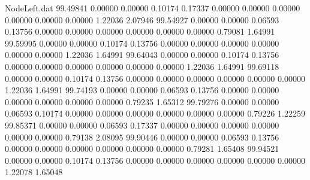 \begin{filecontents}{NodeLeft.dat}
  99.49841    0.00000    0.00000     0.10174    0.17337    0.00000    0.00000    0.00000    0.00000    0.00000    0.00000    1.22036    2.07946
  99.54927    0.00000    0.00000     0.06593    0.13756    0.00000    0.00000    0.00000    0.00000    0.00000    0.00000    0.79081    1.64991
  99.59995    0.00000    0.00000     0.10174    0.13756    0.00000    0.00000    0.00000    0.00000    0.00000    0.00000    1.22036    1.64991
  99.64043    0.00000    0.00000     0.10174    0.13756    0.00000    0.00000    0.00000    0.00000    0.00000    0.00000    1.22036    1.64991
  99.69118    0.00000    0.00000     0.10174    0.13756    0.00000    0.00000    0.00000    0.00000    0.00000    0.00000    1.22036    1.64991
  99.74193    0.00000    0.00000     0.06593    0.13756    0.00000    0.00000    0.00000    0.00000    0.00000    0.00000    0.79235    1.65312
  99.79276    0.00000    0.00000     0.06593    0.10174    0.00000    0.00000    0.00000    0.00000    0.00000    0.00000    0.79226    1.22259
  99.85371    0.00000    0.00000     0.06593    0.17337    0.00000    0.00000    0.00000    0.00000    0.00000    0.00000    0.79138    2.08095
  99.90446    0.00000    0.00000     0.06593    0.13756    0.00000    0.00000    0.00000    0.00000    0.00000    0.00000    0.79281    1.65408
  99.94521    0.00000    0.00000     0.10174    0.13756    0.00000    0.00000    0.00000    0.00000    0.00000    0.00000    1.22078    1.65048
\end{filecontents}
